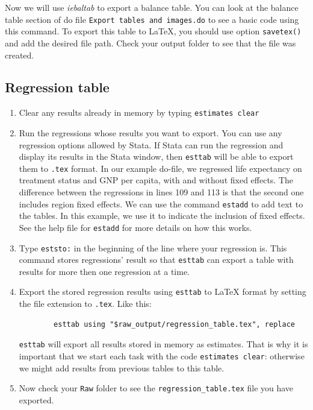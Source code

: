 \documentclass[]{article}
\begin{document}
Now we will use \emph{iebaltab} to export a balance table. You can look at the balance table section of do file \texttt{Export tables and images.do} to see a basic code using this command. To export this table to {\LaTeX}, you should use option \texttt{savetex()} and add the desired file path. Check your output folder to see that the file was created.


\subsection{Regression table}

\begin{enumerate}
	\item Clear any results already in memory by typing \texttt{estimates clear}
	\item Run the regressions whose results you want to export. You can use any regression options allowed by Stata. If Stata can run the regression and display its results in the Stata window, then \texttt{esttab} will be able to export them to \texttt{.tex} format. In our example do-file, we regressed life expectancy on treatment status and GNP per capita, with and without fixed effects. The difference between the regressions in lines 109 and 113 is that the second one includes region fixed effects. We can use the command \texttt{estadd} to add text to the tables. In this example, we use it to indicate the inclusion of fixed effects. See the help file for \texttt{estadd} for more details on how this works.
	\item Type \texttt{eststo:} in the beginning of the line where your regression is. This command stores regressions' result so that \texttt{esttab} can export a table with results for more then one regression at a time.
	\item Export the stored regression results using \texttt{esttab} to {\LaTeX} format by setting the file extension to \texttt{.tex}. Like this: 
	\begin{Verbatim}
		esttab using "$raw_output/regression_table.tex", replace
	\end{Verbatim}
	
	\texttt{esttab} will export all results stored in memory as estimates. That is why it is important that we start each task with the code \texttt{estimates 	clear}: otherwise we might add results from previous tables to this table.
	\item Now check your \texttt{Raw} folder to see the \texttt{regression\_table.tex} file you have exported.
\end{enumerate}
\end{document}

